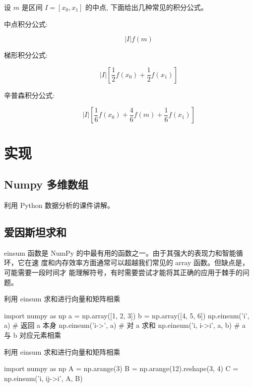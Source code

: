 \documentclass{article}
\begin{document}
\begin{framed}
    设 $m$ 是区间  $I = [x_0, x_1]$ 的中点, 下面给出几种常见的积分公式。
    \begin{description}
        \item[中点积分公式:] 
            $$ |I|f(m)$$
        \item[梯形积分公式:] 
            $$ |I|\left[\frac{1}{2}f(x_0) +\frac{1}{2}f(x_1) \right] $$
        \item[辛普森积分公式:]
            $$|I|\left[\frac{1}{6}f(x_0) + \frac{4}{6}f(m) + \frac{1}{6}f(x_1)\right]$$
    \end{description}
\end{framed}

\section{实现}

\subsection{Numpy 多维数组}

利用 Python 数据分析的课件讲解。

\subsection{爱因斯坦求和}

einsum 函数是 NumPy 的中最有用的函数之一。由于其强大的表现力和智能循环，它在速
度和内存效率方面通常可以超越我们常见的 array 函数。但缺点是，可能需要一段时间才
能理解符号，有时需要尝试才能将其正确的应用于棘手的问题。

\begin{listing}[H]
    \caption{利用 einsum 求和进行向量和矩阵相乘}
    \begin{pythoncode}
        import numpy as np
        a = np.array([1, 2, 3])
        b = np.array([4, 5, 6])
        np.einsum('i', a) # 返回 a 本身
        np.einsum('i->', a) # 对 a 求和
        np.einsum('i, i->i', a, b) # a 与 b 对应元素相乘
    \end{pythoncode}
\end{listing}


\begin{listing}[H]
    \caption{利用 einsum 求和进行向量和矩阵相乘}
    \begin{pythoncode}
        import numpy as np
        A = np.arange(3)
        B = np.arange(12).reshape(3, 4)
        C = np.einsum('i, ij->i', A, B)
    \end{pythoncode}
\end{listing}
\end{document}
